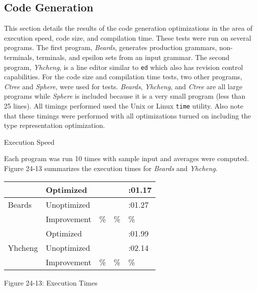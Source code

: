 \subsection{Code Generation}

This section details the results of the code generation optimizations
in the area of execution speed, code size, and compilation time. These
tests were run on several programs. The first program,
\textit{Beards}, generates production grammars, non-terminals,
terminals, and epsilon sets from an input grammar. The second program,
\textit{Yhcheng}, is a line editor similar to \texttt{ed} which also
has revision control capabilities. For the code size and compilation
time tests, two other programs, \textit{Ctree} and \textit{Sphere},
were used for tests. \textit{Beards}, \textit{Yhcheng}, and
\textit{Ctree} are all large programs while \textit{Sphere} is
included because it is a very small program (less than 25 lines).  All
timings performed used the Unix or Linux \texttt{time} utility.  Also
note that these timings were performed with all optimizations turned
on including the type representation optimization.

{\sffamily
Execution Speed}

Each program was run 10 times with sample input and averages were
computed. Figure 24-13 summarizes the execution times for
\textit{Beards} and \textit{Yhcheng}.

\begin{center}
\tabletail{}
\tablelasttail{}
\begin{xtabular}{|m{1.1212599in}|m{1.1212599in}|m{1.1212599in}|m{1.1212599in}|m{1.1212599in}|}
\hline
~
 &
 Optimized &
 &
 &
\raggedleft{}:01.17\\\hline
 Beards &
 Unoptimized &
 &
 &
\raggedleft{}:01.27\\\hline
~
 &
 Improvement &
\% &
\% &
\raggedleft{}\%\\\hline
~
 &
 Optimized &
 &
 &
\raggedleft{}:01.99\\\hline
 Yhcheng &
 Unoptimized &
 &
 &
\raggedleft{}:02.14\\\hline
~
 &
 Improvement &
\% &
\% &
\raggedleft{}\%\\\hline
\end{xtabular}
\end{center}
{\centering{}
Figure 24-13: Execution Times
\par}

